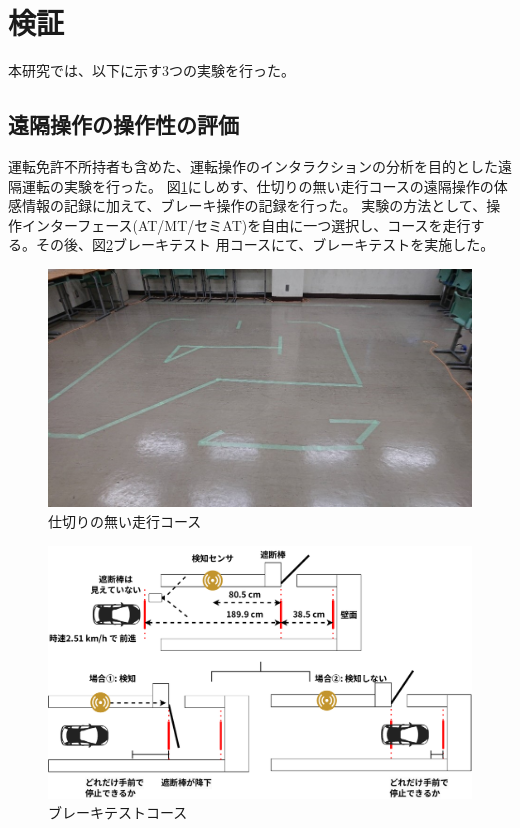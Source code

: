 \clearpage
\section{検証}
本研究では、以下に示す3つの実験を行った。
\subsection{遠隔操作の操作性の評価}
運転免許不所持者も含めた、運転操作のインタラクションの分析を目的とした遠隔運転の実験を行った。
図\ref{auto:course}にしめす、仕切りの無い走行コースの遠隔操作の体感情報の記録に加えて、ブレーキ操作の記録を行った。
実験の方法として、操作インターフェース(AT/MT/セミAT)を自由に一つ選択し、コースを走行する。その後、図\ref{auto:break}ブレーキテスト
用コースにて、ブレーキテストを実施した。

\begin{figure}[h]
  \begin{center}
    \includegraphics[width=.6\linewidth]{img/auto_47.jpg}
    \caption{仕切りの無い走行コース}
    \label{auto:course}
  \end{center}
\end{figure}

\begin{figure}[h]
  \begin{center}
    \includegraphics[width=.6\linewidth]{img/auto_48.pdf}
    \caption{ブレーキテストコース}
    \label{auto:break}
  \end{center}
\end{figure}

